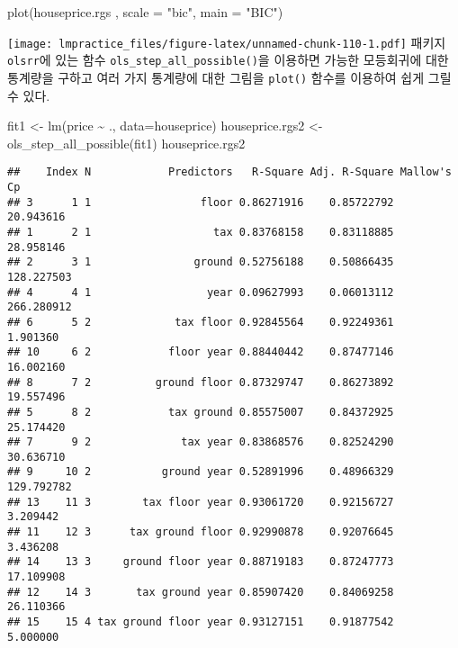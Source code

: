 \documentclass[
]{book}
\newenvironment{Shaded}{\begin{snugshade}}{\end{snugshade}}
\newcommand{\AttributeTok}[1]{\textcolor[rgb]{0.77,0.63,0.00}{#1}}
\newcommand{\FunctionTok}[1]{\textcolor[rgb]{0.00,0.00,0.00}{#1}}
\newcommand{\NormalTok}[1]{#1}
\newcommand{\OtherTok}[1]{\textcolor[rgb]{0.56,0.35,0.01}{#1}}
\newcommand{\SpecialCharTok}[1]{\textcolor[rgb]{0.00,0.00,0.00}{#1}}
\newcommand{\StringTok}[1]{\textcolor[rgb]{0.31,0.60,0.02}{#1}}
\begin{document}
\begin{Shaded}
\begin{Highlighting}[]
\FunctionTok{plot}\NormalTok{(houseprice.rgs , }\AttributeTok{scale =} \StringTok{"bic"}\NormalTok{, }\AttributeTok{main =} \StringTok{"BIC"}\NormalTok{)}
\end{Highlighting}
\end{Shaded}

\texttt{[image: lmpractice\_files/figure-latex/unnamed-chunk-110-1.pdf]}
패키지 \texttt{olsrr}에 있는 함수 \texttt{ols\_step\_all\_possible()}을 이용하면 가능한 모등회귀에 대한
통계량을 구하고 여러 가지 통계량에 대한 그림을 \texttt{plot()} 함수를 이용하여 쉽게 그릴 수 있다.

\begin{Shaded}
\begin{Highlighting}[]
\NormalTok{fit1 }\OtherTok{\textless{}{-}} \FunctionTok{lm}\NormalTok{(price }\SpecialCharTok{\textasciitilde{}}\NormalTok{ ., }\AttributeTok{data=}\NormalTok{houseprice)}
\NormalTok{houseprice.rgs2 }\OtherTok{\textless{}{-}} \FunctionTok{ols\_step\_all\_possible}\NormalTok{(fit1)}
\NormalTok{houseprice.rgs2}
\end{Highlighting}
\end{Shaded}

\begin{verbatim}
##    Index N            Predictors   R-Square Adj. R-Square Mallow's Cp
## 3      1 1                 floor 0.86271916    0.85722792   20.943616
## 1      2 1                   tax 0.83768158    0.83118885   28.958146
## 2      3 1                ground 0.52756188    0.50866435  128.227503
## 4      4 1                  year 0.09627993    0.06013112  266.280912
## 6      5 2             tax floor 0.92845564    0.92249361    1.901360
## 10     6 2            floor year 0.88440442    0.87477146   16.002160
## 8      7 2          ground floor 0.87329747    0.86273892   19.557496
## 5      8 2            tax ground 0.85575007    0.84372925   25.174420
## 7      9 2              tax year 0.83868576    0.82524290   30.636710
## 9     10 2           ground year 0.52891996    0.48966329  129.792782
## 13    11 3        tax floor year 0.93061720    0.92156727    3.209442
## 11    12 3      tax ground floor 0.92990878    0.92076645    3.436208
## 14    13 3     ground floor year 0.88719183    0.87247773   17.109908
## 12    14 3       tax ground year 0.85907420    0.84069258   26.110366
## 15    15 4 tax ground floor year 0.93127151    0.91877542    5.000000
\end{verbatim}
\end{document}
